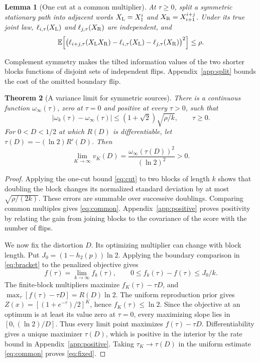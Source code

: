\documentclass[11pt,letterpaper]{article}
\newtheorem{theorem}{Theorem}
\newtheorem{lemma}[theorem]{Lemma}
\theoremstyle{definition}
\newcommand{\E}{\mathbb E}
\newcommand{\hx}{h_2}
\begin{document}
\begin{lemma}[One cut at a common multiplier]\label{lem:cut}
At $\tau\ge0$, split a symmetric stationary path into adjacent words $X_{\rm L}=X_1^i$ and $X_{\rm R}=X_{i+1}^{i+j}$. Under its true joint law, $\ell_{i,\tau}(X_{\rm L})$ and $\ell_{j,\tau}(X_{\rm R})$ are independent, and
\[
 \E\!\left[\big(\ell_{i+j,\tau}(X_{\rm L}X_{\rm R})-\ell_{i,\tau}(X_{\rm L})-\ell_{j,\tau}(X_{\rm R})\big)^2\right]\le\rho .
\]
\end{lemma}
Complement symmetry makes the tilted information values of the two shorter blocks functions of disjoint sets of independent flips. Appendix~\ref{app:split} bounds the cost of the omitted boundary flip.
\begin{theorem}[A variance limit for symmetric sources]\label{thm:common}
There is a continuous function $\omega_\infty(\tau)$, zero at $\tau=0$ and positive at every $\tau>0$, such that
\begin{equation}
 |\omega_k(\tau)-\omega_\infty(\tau)|\le(1+\sqrt2)\sqrt{\rho/k},\qquad \tau\ge0 .  \label{eq:common}
\end{equation}
For $0<D<1/2$ at which $R(D)$ is differentiable, let $\tau(D)=-(\ln2)R'(D)$. Then
\begin{equation}
 \lim_{K\to\infty}v_K(D)=\frac{\omega_\infty(\tau(D))^2}{(\ln2)^2}>0.  \label{eq:fixed}
\end{equation}
\end{theorem}
\begin{proof}
Applying the one-cut bound \eqref{eq:cut} to two blocks of length $k$ shows that doubling the block changes its normalized standard deviation by at most $\sqrt{\rho/(2k)}$. These errors are summable over successive doublings. Comparing common multiples gives \eqref{eq:common}. Appendix~\ref{app:positive} proves positivity by relating the gain from joining blocks to the covariance of the score with the number of flips.

We now fix the distortion $D$. Its optimizing multiplier can change with block length. Put $J_0=(1-\hx(p))\ln 2$. Applying the boundary comparison in \eqref{eq:bracket} to the penalized objective gives
\begin{equation}
 f(\tau)=\lim_{k\to\infty} f_k(\tau),\qquad 0\le f_k(\tau)-f(\tau)\le J_0/k .
 \label{eq:redun}
\end{equation}
The finite-block multipliers maximize $f_K(\tau)-\tau D$, and $\max_\tau[f(\tau)-\tau D]=R(D)\ln2$. The uniform reproduction prior gives $Z(x)=[(1+e^{-\tau})/2]^K$, hence $f_K(\tau)\le\ln2$. Since the objective at an optimum is at least its value zero at $\tau=0$, every maximizing slope lies in $[0,(\ln2)/D]$. Thus every limit point maximizes $f(\tau)-\tau D$. Differentiability gives a unique maximizer $\tau(D)$, which is positive in the interior by the rate bound in Appendix~\ref{app:positive}. Taking $\tau_K\to \tau(D)$ in the uniform estimate \eqref{eq:common} proves \eqref{eq:fixed}.
\end{proof}
\end{document}
